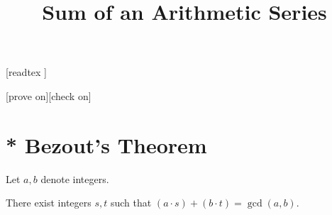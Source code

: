 \documentclass{article}
\title{Sum of an Arithmetic Series}
\author{}
\date{}
\begin{document}
\maketitle

\begin{forthel}

    [readtex ]

    [prove on][check on]
\end{forthel}


\section{* Bezout's Theorem}


\begin{forthel}

Let $a,b$ denote integers.

\begin{proposition}
There exist integers $s,t$ such that $(a \cdot s) + (b \cdot t) = \gcd(a,b)$.
\end{proposition}

\end{forthel}
\end{document}
